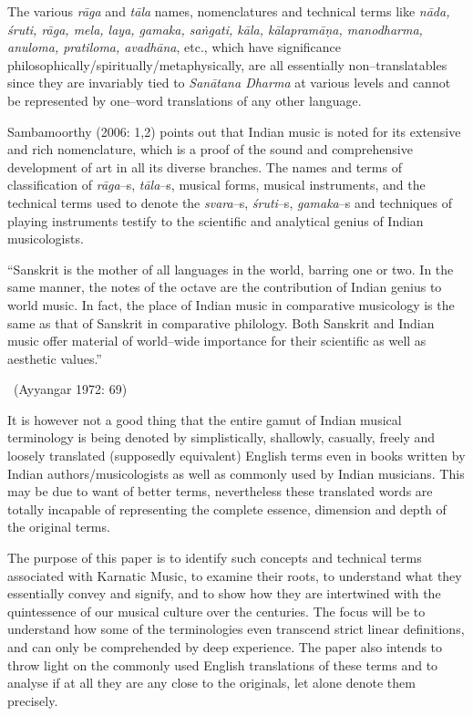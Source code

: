 The various \textit{rāga} and \textit{tāla} names, nomenclatures and technical terms like \textit{nāda, śruti, rāga, mela, laya, gamaka, saṅgati, kāla, kālapramāṇa, manodharma, anuloma, pratiloma, avadhāna}, etc., which have significance philosophically/spiritually/metaphysically, are all essentially non–translatables since they are invariably tied to \textit{Sanātana Dharma} at various levels and cannot be represented by one–word translations of any other language.

Sambamoorthy (2006: 1,2) points out that Indian music is noted for its extensive and rich nomenclature, which is a proof of the sound and comprehensive development of art in all its diverse branches. The names and terms of classification of \textit{rāga}–s, \textit{tāla}–s, musical forms, musical instruments, and the technical terms used to denote the \textit{svara}–s, \textit{śruti}–s, \textit{gamaka}–s and techniques of playing instruments testify to the scientific and analytical genius of Indian musicologists.

\begin{myquote}
“Sanskrit is the mother of all languages in the world, barring one or two. In the same manner, the notes of the octave are the contribution of Indian genius to world music. In fact, the place of Indian music in comparative musicology is the same as that of Sanskrit in comparative philology. Both Sanskrit and Indian music offer material of world–wide importance for their scientific as well as aesthetic values.” 

~\hfill (Ayyangar 1972: 69)
\end{myquote}

It is however not a good thing that the entire gamut of Indian musical terminology is being denoted by simplistically, shallowly, casually, freely and loosely translated (supposedly equivalent) English terms even in books written by Indian authors/musicologists as well as commonly used by Indian musicians. This may be due to want of better terms, nevertheless these translated words are totally incapable of representing the complete essence, dimension and depth of the original terms. 

The purpose of this paper is to identify such concepts and technical terms associated with Karnatic Music, to examine their roots, to understand what they essentially convey and signify, and to show how they are intertwined with the quintessence of our musical culture over the centuries. The focus will be to understand how some of the terminologies even transcend strict linear definitions, and can only be comprehended by deep experience. The paper also intends to throw light on the commonly used English translations of these terms and to analyse if at all they are any close to the originals, let alone denote them precisely.

